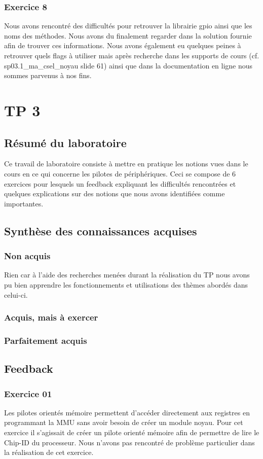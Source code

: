 \documentclass{ReportTemplate}
\begin{document}
\subsection{Exercice 8}
Nous avons rencontré des difficultés pour retrouver la librairie gpio ainsi que
les noms des méthodes. Nous avons du finalement regarder dans la solution
fournie afin de trouver ces informations. Nous avons également eu quelques
peines à retrouver quels flags à utiliser mais après recherche dans les supports
de cours (cf. sp03.1\_ma\_csel\_noyau slide 61) ainsi que dans la documentation
en ligne nous sommes parvenus à nos fins.

\chapter{TP 3}
\section{Résumé du laboratoire}
Ce travail de laboratoire consiste à mettre en pratique les notions vues dans le
cours en ce qui concerne les pilotes de périphériques. Ceci se compose de 6
exercices pour lesquels un feedback expliquant les difficultés rencontrées et
quelques explications sur des notions que nous avons identifiées comme importantes.
\section{Synthèse des connaissances acquises}
\subsection{Non acquis}
Rien car à l'aide des recherches menées durant la réalisation du TP nous avons
pu bien apprendre les fonctionnements et utilisations des thèmes abordés dans celui-ci.
\subsection{Acquis, mais à exercer}

\subsection{Parfaitement acquis}
\section{Feedback}
\subsection{Exercice 01}
Les pilotes orientés mémoire permettent d'accéder directement aux
registres en programmant la MMU sans avoir besoin de créer un module noyau.
Pour cet exercice il s'agissait de créer un pilote orienté mémoire afin de
permettre de lire le Chip-ID du processeur. Nous n'avons pas rencontré de
problème particulier dans la réalisation de cet exercice.
\end{document}
